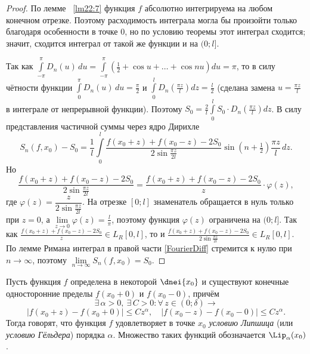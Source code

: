 \begin{proof}
По лемме ~\ref{lm22:7} функция $f$ абсолютно интегрируема на любом конечном отрезке. Поэтому расходимость интеграла могла бы произойти только благодаря особенности в точке $0$, но по условию теоремы этот интеграл сходится; значит, сходится интеграл от такой же функции и на $(0; l]$.

Так как $\int\limits_{-\pi}^{\pi} D_n(u)\,du = \int\limits_{-\pi}^{\pi} \left( \frac{1}{2} + \cos u + \ldots + \cos nu \right) du = \pi$, то в силу чётности функции $\int\limits_0^{\pi} D_n(u)\,du = \frac{\pi}{2}$ и $\int\limits_0^l D_n\!\left( \frac{\pi z}{l} \right) dz = \frac{l}{2}$ (сделана замена $u = \frac{\pi z}{l}$ в интеграле от непрерывной функции). Поэтому $S_0 = \frac{2}{l} \int\limits_0^l S_0 \cdot D_n\!\left( \frac{\pi z}{l} \right) dz$. В силу представления частичной суммы через ядро Дирихле
\begin{equation} \label{FourierDiff}
S_n(f, x_0) - S_0 = \frac{1}{l} \int\limits_0^l \frac{f(x_0 + z) + f(x_0 - z) - 2 S_0}{2 \sin \frac{\pi z}{2l}} \sin\!\left( n + \tfrac{1}{2} \right)\!\frac{\pi z}{l}\,dz.
\end{equation}
Но
$$
\frac{f(x_0 + z) + f(x_0 - z) - 2 S_0}{2 \sin \frac{\pi z}{2l}} = \frac{f(x_0 + z) + f(x_0 - z) - 2 S_0}{z} \cdot \varphi(z),
$$
где $\varphi(z) = \dfrac{z}{2 \sin \frac{\pi z}{2l}}$. На отрезке $[0; l]$ знаменатель обращается в нуль только при $z = 0$, а $\lim\limits_{z \to 0} \varphi(z) = \frac{l}{\pi}$, поэтому функция $\varphi(z)$ ограничена на $(0; l]$. Так как $\frac{f(x_0 + z) + f(x_0 - z) - 2 S_0}{z} \in L_R[0, l]$, то и $\frac{f(x_0 + z) + f(x_0 - z) - 2 S_0}{2 \sin \frac{\pi z}{2l}} \in L_R[0, l]$. По лемме Римана интеграл в правой части \eqref{FourierDiff} стремится к нулю при $n \to \infty$, поэтому $\lim\limits_{n \to \infty} S_n(f, x_0) = S_0$.
\end{proof}

\begin{defn}
Пусть функция $f$ определена в некоторой $\dnei{x_0}$ и существуют конечные односторонние пределы $f(x_0 + 0)$ и $f(x_0 - 0)$, причём
$$
\exists\, \alpha > 0,\ \exists\, C > 0 : \forall\, z \in (0; \delta) \longrightarrow
$$
$$
|f(x_0 + z) - f(x_0 + 0)| \le C z^\alpha, \quad |f(x_0 - z) - f(x_0 - 0)| \le C z^\alpha.
$$
Тогда говорят, что функция $f$ удовлетворяет в точке $x_0$ \textit{условию Липшица} (или \textit{условию Гёльдера}) порядка $\alpha$. Множество таких функций обозначается $\Lip_\alpha(x_0)$.
\end{defn}


